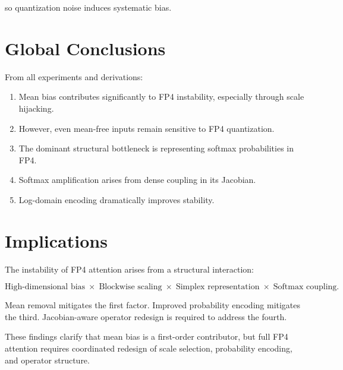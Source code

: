 so quantization noise induces systematic bias.

\section{Global Conclusions}

From all experiments and derivations:

\begin{enumerate}
\item Mean bias contributes significantly to FP4 instability,
      especially through scale hijacking.
\item However, even mean-free inputs remain sensitive to FP4 quantization.
\item The dominant structural bottleneck is representing
      softmax probabilities in FP4.
\item Softmax amplification arises from dense coupling in its Jacobian.
\item Log-domain encoding dramatically improves stability.
\end{enumerate}

\section{Implications}

The instability of FP4 attention arises from a structural interaction:

\begin{equation}
\text{High-dimensional bias}
\;\times\;
\text{Blockwise scaling}
\;\times\;
\text{Simplex representation}
\;\times\;
\text{Softmax coupling}.
\end{equation}

Mean removal mitigates the first factor.
Improved probability encoding mitigates the third.
Jacobian-aware operator redesign is required to address the fourth.

\bigskip

These findings clarify that mean bias is a first-order contributor,
but full FP4 attention requires coordinated redesign of
scale selection, probability encoding, and operator structure.